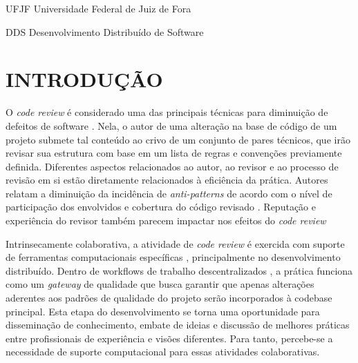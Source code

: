 \documentclass[12pt,openany,oneside,a4paper,english,brazil]{abntbibufjf}
\begin{document}
 \listoftables*
 \cleardoublepage

\begin{siglas} %
  \item[UFJF] Universidade Federal de Juiz de Fora
  \item[DDS]  Desenvolvimento Distribuído de Software
\end{siglas}

\tableofcontents*
\cleardoublepage



\textual
\pagestyle{simple}


\chapter{INTRODUÇÃO}  %

  O \textit{code review} é considerado uma das principais técnicas para diminuição de defeitos de software \cite{Boehm2001}. Nela, o autor de uma alteração na base de código de um projeto submete tal conteúdo ao crivo de um conjunto de pares técnicos, que irão revisar sua estrutura com base em um lista de regras e convenções previamente definida. Diferentes aspectos relacionados ao autor, ao revisor e ao processo de revisão em si estão diretamente relacionados à eficiência da prática. Autores relatam a diminuição da incidência de \textit{anti-patterns} \cite{Kemerer2009} de acordo com o nível de participação dos envolvidos e cobertura do código revisado \cite{Meneely201437, Morales2015171, Bavota201581}. Reputação \cite{Baysal2013122, Bosu2014} e experiência \cite{Kononenko2015111} do revisor também parecem impactar nos efeitos do \textit{code review}

  Intrinsecamente colaborativa, a atividade de \textit{code review} é exercida com suporte de ferramentas computacionais específicas \cite{Bacchelli2013}, principalmente no desenvolvimento distribuído. Dentro de workflows de trabalho descentralizados \cite{gousios2016}, a prática funciona como um \textit{gateway} de qualidade que busca garantir que apenas alterações aderentes aos padrões de qualidade do projeto serão incorporados à codebase principal. Esta etapa do desenvolvimento se torna uma oportunidade para disseminação de conhecimento, embate de ideias e discussão de melhores práticas entre profissionais de experiência e visões diferentes. Para tanto, percebe-se a necessidade de suporte computacional para essas atividades colaborativas.
\end{document}
